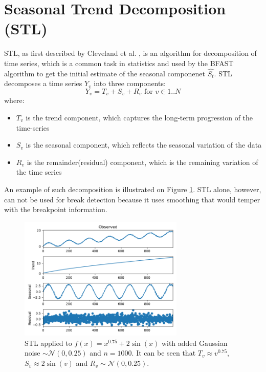 \documentclass[main.tex]{subfiles}
\begin{document}
\section{Seasonal Trend Decomposition (STL)}
\label{sec:seasonal_trend_decomposition_using_loess}
STL, as first described by Cleveland et al. \cite{stl}, is an
algorithm for decomposition of time series, which is a common task in
statistics and used by the BFAST algorithm to get the initial estimate of the
seasonal componenet $\hat{S_t}$.
STL decomposes a time series $Y_v$ into three components:
\[
Y_v = T_v + S_v + R_v \text{ for } v \in 1..N
\]
where:
\begin{itemize}
\item $T_v$ is the trend component, which captures the long-term progression of
  the time-series
\item $S_v$ is the seasonal component, which reflects the seasonal variation of
  the data
\item $R_v$ is the remainder(residual) component, which is the remaining variation of the time series
\end{itemize}
An example of such decomposition is illustrated on Figure \ref{fig_stl}.
STL alone, however, can not be used for break detection because it uses smoothing
that would temper with the breakpoint information.
\begin{figure}
  \centering
  \includegraphics[width=0.7\textwidth]{imgs/stl1}
  \caption{STL applied to $f(x) = x^{0.75} + 2\sin(x)$ with added Gaussian noise
    $\sim \mathcal{N}(0, 0.25)$ and $n = 1000$. It can be seen that
    $T_v \approx v^{0.75}$, $S_v \approx 2\sin(v)$ and $R_v \sim \mathcal{N}(0, 0.25)$. }
  \label{fig_stl}
\end{figure}
\end{document}
